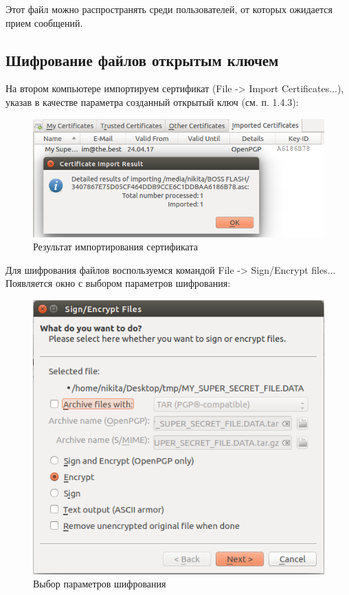 \documentclass[14pt,a4paper,report]{report}
\begin{document}
Этот файл можно распространять среди пользователей, от которых ожидается прием сообщений.

\clearpage

\subsection{Шифрование файлов открытым ключем}

На втором компьютере импортируем сертификат (File -> Import Certificates...), указав в качестве параметра созданный открытый ключ (см. п. 1.4.3):

\begin{figure}[h!]
	\centering
	\includegraphics[scale = 0.55]{images/2_1.png}
	
	\caption{Результат импортирования сертификата}
	\label{image:6}
\end{figure}

Для шифрования файлов воспользуемся командой File -> Sign/Encrypt files... Появляется окно с выбором параметров шифрования:

\begin{figure}[h!]
	\centering
	\includegraphics[scale = 0.53]{images/2_2.png}
	
	\caption{Выбор параметров шифрования}
	\label{image:7}
\end{figure}
\end{document}
